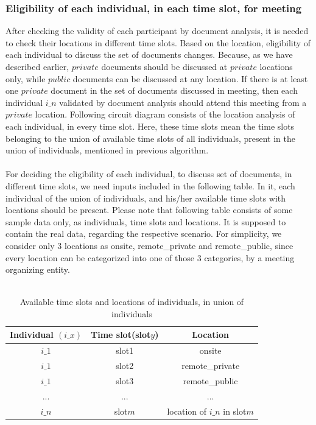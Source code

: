 \documentclass{article}
\begin{document}
\subsubsection{Eligibility of each individual, in each time slot, for meeting}
After checking the validity of each participant by document analysis, it is needed to check their locations in different time slots. Based on the location, eligibility of each individual to discuss the set of documents changes. Because, as we have described earlier, $private$ documents should be discussed at $private$ locations only, while $public$ documents can be discussed at any location. If there is at least one $private$ document in the set of documents discussed in meeting, then each individual $i\_n$ validated by document analysis should attend this meeting from a $private$ location. Following circuit diagram consists of the location analysis of each individual, in every time slot. Here, these time slots mean the time slots belonging to the union of available time slots of all individuals, present in the union of individuals, mentioned in previous algorithm.\\ \\ 
For deciding the eligibility of each individual, to discuss set of documents, in different time slots, we need inputs included in the following table. In it, each individual of the union of individuals, and his/her available time slots with locations should be present. Please note that following table consists of some sample data only, as individuals, time slots and locations. It is supposed to contain the real data, regarding the respective scenario. For simplicity, we consider only 3 locations as onsite, remote\_private and remote\_public, since every location can be categorized into one of those 3 categories, by a meeting organizing entity.\\ \\
\begin{table}[H]
    \centering
    \begin{tabular}{|c|c|c|}
    \hline
    Individual $(i\_x)$ & Time slot(slot$y$) & Location \\
    \hline
    $i\_1$ & slot1 & onsite \\
    \hline
    $i\_1$ & slot2 & remote\_private \\
    \hline
    $i\_1$ & slot3 & remote\_public \\
    \hline
    ... & ... & ... \\
    \hline
    $i\_n$ & slot$m$ & location of $i\_n$ in slot$m$ \\
    \hline
    \end{tabular}
    \caption{Available time slots and locations of individuals, in union of individuals}
    \label{tab:three_columns_six_rows}
\end{table}
\end{document}
